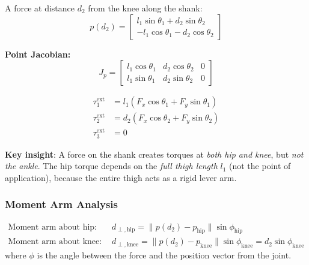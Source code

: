 \documentclass[11pt,a4paper]{article}
\newcommand{\vc}[1]{\bm{#1}}
\def\vc#1{#1}%
\def\bm#1{#1}%
\begin{document}
A force at distance $d_2$ from the knee along the shank:
\begin{equation}
    \vc{p}(d_2) = \begin{bmatrix}
        l_1 \sin\theta_1 + d_2 \sin\theta_2 \\
        -l_1 \cos\theta_1 - d_2 \cos\theta_2
    \end{bmatrix}
\end{equation}

\textbf{Point Jacobian:}
\begin{equation}
    \vc{J}_{p} = \begin{bmatrix}
        l_1 \cos\theta_1 & d_2 \cos\theta_2 & 0 \\
        l_1 \sin\theta_1 & d_2 \sin\theta_2 & 0
    \end{bmatrix}
    \label{eq:J_shank}
\end{equation}

\begin{resultbox}
\begin{align}
    \tau_1^{\text{ext}} &= l_1 (F_x \cos\theta_1 + F_y \sin\theta_1)
    \label{eq:tau1_shank} \\
    \tau_2^{\text{ext}} &= d_2 (F_x \cos\theta_2 + F_y \sin\theta_2)
    \label{eq:tau2_shank} \\
    \tau_3^{\text{ext}} &= 0 \label{eq:tau3_shank}
\end{align}

\textbf{Key insight}: A force on the shank creates torques at \textit{both
hip and knee}, but \textit{not the ankle}. The hip torque depends on the
\textit{full thigh length} $l_1$ (not the point of application), because
the entire thigh acts as a rigid lever arm.
\end{resultbox}

\subsubsection*{Moment Arm Analysis}

\begin{align}
    \text{Moment arm about hip:}\quad
    & d_{\perp,\text{hip}} = \bigl\|\vc{p}(d_2) - \vc{p}_{\text{hip}}\bigr\| \sin\phi_{\text{hip}} \nonumber \\
    \text{Moment arm about knee:}\quad
    & d_{\perp,\text{knee}} = \bigl\|\vc{p}(d_2) - \vc{p}_{\text{knee}}\bigr\| \sin\phi_{\text{knee}}
    = d_2 \sin\phi_{\text{knee}}
\end{align}
where $\phi$ is the angle between the force and the position vector from the joint.
\end{document}
